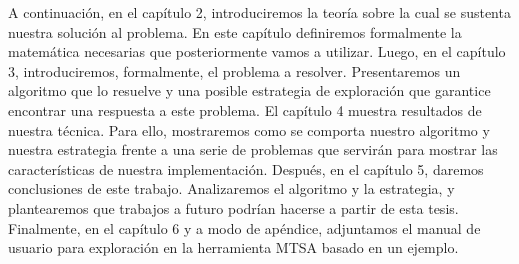 A continuación, en el capítulo 2, introduciremos la teoría sobre la cual se 
sustenta nuestra 
solución al problema. 
En este capítulo definiremos formalmente la matemática necesarias que 
posteriormente vamos a utilizar. Luego, en el capítulo 3, introduciremos, 
formalmente, el problema a resolver. Presentaremos un algoritmo que lo resuelve 
y una posible estrategia de exploración que garantice encontrar una respuesta a 
este problema. El capítulo 4 muestra resultados de nuestra técnica.
Para ello, mostraremos como se comporta nuestro algoritmo y nuestra estrategia 
frente a una serie de problemas que servirán para mostrar las características 
de nuestra implementación. Después, en el capítulo 5, daremos conclusiones de 
este trabajo. Analizaremos el algoritmo y la estrategia, y plantearemos que 
trabajos a futuro podrían hacerse a partir de esta tesis. 
Finalmente, en el capítulo 6 y a modo de apéndice, adjuntamos el manual de 
usuario para exploración en la herramienta MTSA basado en un ejemplo.
